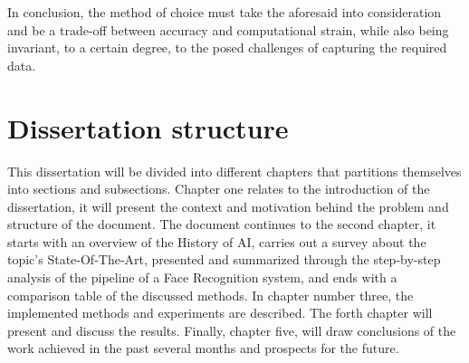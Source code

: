 \documentclass[class=report, crop=false, a4paper, 12pt]{standalone}
\begin{document}
\par In conclusion, the method of choice must take the aforesaid into consideration and be a trade-off between accuracy and computational strain, while also being invariant, to a certain degree, to the posed challenges of capturing the required data. 


\section{Dissertation structure}
\par This dissertation will be divided into different chapters that partitions themselves into sections and subsections. Chapter one relates to the introduction of the dissertation, it will present the context and motivation behind the problem and structure of the document. The document continues to the second chapter, it starts with an overview of the History of AI, carries out a survey about the topic's State-Of-The-Art, presented and summarized through the step-by-step analysis of the pipeline of a Face Recognition system, and ends with a comparison table of the discussed methods. In chapter number three, the implemented methods and experiments are described. The forth chapter will present and discuss the results. Finally, chapter five, will draw conclusions of the work achieved in the past several months and prospects for the future.
\end{document}
